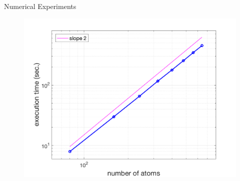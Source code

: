 \begin{frame}{Numerical Experiments}

\begin{figure}
\begin{center}
\includegraphics[scale=0.45]{figures/plot.png}
\end{center}
\end{figure}

\end{frame}
